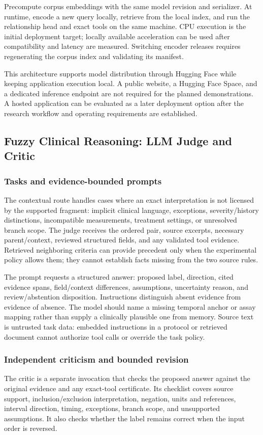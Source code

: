 \documentclass[10pt,letterpaper]{article}
\begin{document}
Precompute corpus embeddings with the same model revision and serializer.
At runtime, encode a new query locally, retrieve from the local index, and
run the relationship head and exact tools on the same machine. CPU execution
is the initial deployment target; locally available acceleration can be used
after compatibility and latency are measured. Switching encoder releases
requires regenerating the corpus index and validating its manifest.

This architecture supports model distribution through Hugging Face while
keeping application execution local. A public website, a Hugging Face Space,
and a dedicated inference endpoint are not required for the planned
demonstrations. A hosted application can be evaluated as a later deployment
option after the research workflow and operating requirements are established.

\subsection{Fuzzy Clinical Reasoning: LLM Judge and Critic}
\label{sec:critic}

\subsubsection{Tasks and evidence-bounded prompts}
The contextual route handles cases where an exact interpretation is not
licensed by the supported fragment: implicit clinical language, exceptions,
severity/history distinctions, incompatible measurements, treatment settings,
or unresolved branch scope. The judge receives the ordered pair, source
excerpts, necessary parent/context, reviewed structured fields, and any
validated tool evidence. Retrieved neighboring criteria can provide precedent
only when the experimental policy allows them; they cannot establish facts
missing from the two source rules.

The prompt requests a structured answer: proposed label, direction, cited
evidence spans, field/context differences, assumptions, uncertainty reason,
and review/abstention disposition. Instructions distinguish absent evidence
from evidence of absence. The model should name a missing temporal anchor or
assay mapping rather than supply a clinically plausible one from memory.
Source text is untrusted task data: embedded instructions in a protocol or
retrieved document cannot authorize tool calls or override the task policy.

\subsubsection{Independent criticism and bounded revision}
The critic is a separate invocation that checks the proposed answer against
the original evidence and any exact-tool certificate. Its checklist covers
source support, inclusion/exclusion interpretation, negation, units and
references, interval direction, timing, exceptions, branch scope, and
unsupported assumptions. It also checks whether the label remains correct
when the input order is reversed.
\end{document}
